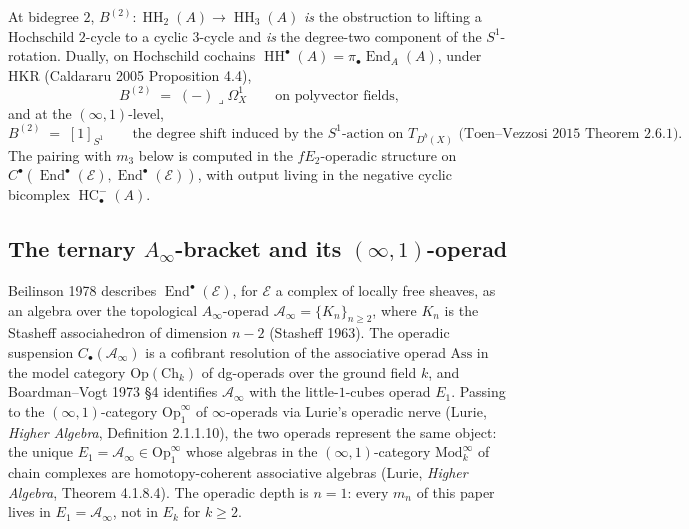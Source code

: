 \documentclass[11pt,reqno]{amsart}
\theoremstyle{plain}
\theoremstyle{definition}
\theoremstyle{remark}
\DeclareMathOperator{\End}{End}
\DeclareMathOperator{\HH}{HH}
\DeclareMathOperator{\HC}{HC}
\newcommand{\cA}{\mathcal{A}}
\newcommand{\cE}{\mathcal{E}}
\begin{document}
At bidegree $2$, $B^{(2)}: \HH_2(A) \to \HH_3(A)$ \emph{is} the obstruction to lifting a Hochschild $2$-cycle to a cyclic $3$-cycle and \emph{is} the degree-two component of the $S^1$-rotation. Dually, on Hochschild cochains $\HH^\bullet(A) = \pi_\bullet \End_A(A)$, under HKR (Caldararu 2005 Proposition 4.4),
\[
  B^{(2)} \;=\; (-) \lrcorner \Omega^1_X \qquad\text{on polyvector fields},
\]
and at the $(\infty,1)$-level,
\[
  B^{(2)} \;=\; [1]_{S^1} \qquad\text{the degree shift induced by the $S^1$-action on } T_{D^b(X)} \text{ (Toen--Vezzosi 2015 Theorem 2.6.1)}.
\] The pairing with $m_3$ below is computed in the $fE_2$-operadic structure on $C^\bullet(\End^\bullet(\cE), \End^\bullet(\cE))$, with output living in the negative cyclic bicomplex $\HC^-_\bullet(A)$.

\subsection{The ternary $A_\infty$-bracket and its $(\infty,1)$-operad}
\label{sub:m3-operad}
Beilinson 1978 describes $\End^\bullet(\cE)$, for $\cE$ a complex of locally free sheaves, as an algebra over the topological $A_\infty$-operad $\cA_\infty = \{K_n\}_{n \geq 2}$, where $K_n$ is the Stasheff associahedron of dimension $n - 2$ (Stasheff 1963). The operadic suspension $C_\bullet(\cA_\infty)$ is a cofibrant resolution of the associative operad $\mathrm{Ass}$ in the model category $\mathrm{Op}(\mathrm{Ch}_k)$ of dg-operads over the ground field $k$, and Boardman--Vogt 1973 \S4 identifies $\cA_\infty$ with the little-$1$-cubes operad $E_1$. Passing to the $(\infty,1)$-category $\mathrm{Op}^\infty_1$ of $\infty$-operads via Lurie's operadic nerve (Lurie, \emph{Higher Algebra}, Definition 2.1.1.10), the two operads represent the same object: the unique $E_1 = \cA_\infty \in \mathrm{Op}^\infty_1$ whose algebras in the $(\infty,1)$-category $\mathrm{Mod}_k^\infty$ of chain complexes are homotopy-coherent associative algebras (Lurie, \emph{Higher Algebra}, Theorem 4.1.8.4). The operadic depth is $n = 1$: every $m_n$ of this paper lives in $E_1 = \cA_\infty$, not in $E_k$ for $k \geq 2$.
\end{document}

